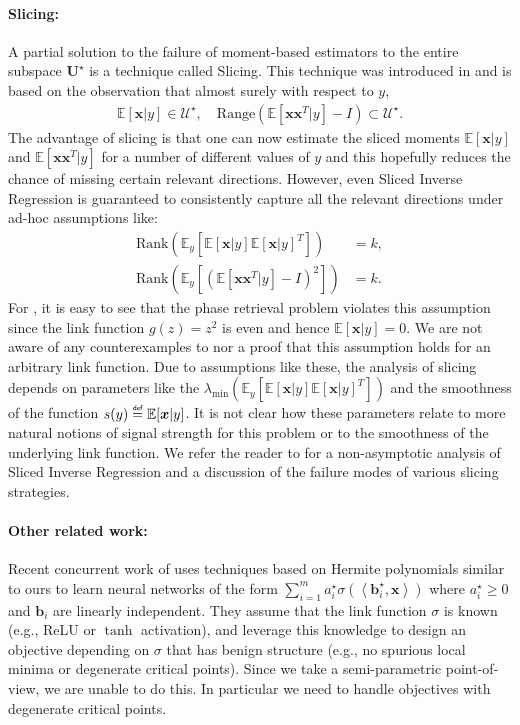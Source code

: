 \documentclass[final,12pt]{colt2018} %
\newcommand{\E}{\mathbb{E}}
\newcommand{\explain}[2]{\mathrel{\overset{\makebox[0pt]{\mbox{\normalfont\tiny\sffamily #1}}}{#2}}}
\renewcommand\v[1]{{\ensuremath{\boldsymbol{#1}}}}
\newcommand\ip[1]{\left\langle #1 \right\rangle}
\begin{document}
\paragraph{Slicing:}
A partial solution to the failure of moment-based estimators to the entire subspace $ \mathcal{\v U}^\star$ is a technique called Slicing. This technique was introduced in \cite{li1991sliced} and is based on the observation that almost surely with respect to $y$,
\begin{align*}
    \E[\v x | y] \in \mathcal{U}^\star , \quad
    \text{Range}(\E[\v x \v x^T | y]-I) \subset \mathcal{U}^\star  .
\end{align*}
The advantage of slicing is that one can now estimate the sliced moments $\E[\v x |y]$ and $\E[\v x \v x^T | y]$ for a number of different values of $y$ and this hopefully reduces the chance of missing certain relevant directions. However, even Sliced Inverse Regression is guaranteed to consistently capture all the relevant directions under ad-hoc assumptions like:
\begin{align}
    \text{Rank} \left( \E_y \left[ \E\left[\v x | y\right] \E\left[ \v x | y\right] ^T \right]\right) & = k , \label{slicing_assumption_1} \\
    \text{Rank} \left( \E_y \left[ \left(\E\left[\v x \v x^T | y\right]-I\right)^2 \right] \right) & = k . \label{slicing_assumption_2}
\end{align}
For , it is easy to see that the phase retrieval problem violates this assumption since the link function $g(z) = z^2$ is even and hence $\E[\v x|y] = 0$. We are not aware of any counterexamples to   nor a proof that this assumption holds for an arbitrary link function. Due to assumptions like these, the analysis of slicing depends on parameters like the $\lambda_{\text{min}} \left( \E_y \left[ \E\left[\v x | y\right] \E\left[ \v x | y\right] ^T \right] \right)$ and the smoothness of the function $s(y)\explain{def}{=}\E[\v x|y]$. It is not clear how these parameters relate to more natural notions of signal strength for this problem or to the smoothness of the underlying link function. We refer the reader to \cite{babichev2016slice} for a non-asymptotic analysis of Sliced Inverse Regression and a discussion of the failure modes of various slicing strategies.

\paragraph{Other related work:}
Recent concurrent work of \citet{ge2017learning} uses techniques based on Hermite polynomials similar to ours to learn neural networks of the form $\sum_{i=1}^m a_i^\star \sigma(\ip{\v b_i^\star,\v x})$ where $a_i^\star \geq 0$ and $\v b_i$ are linearly independent. They assume that the link function $\sigma$ is known (e.g., ReLU or $\tanh$ activation), and leverage this knowledge to design an objective depending on $\sigma$ that has benign structure (e.g., no spurious local minima or degenerate critical points). Since we take a semi-parametric point-of-view, we are unable to do this. In particular we need to handle objectives with degenerate critical points.
\end{document}
